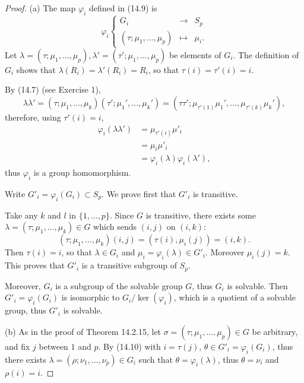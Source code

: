 \documentclass[11pt,a4paper]{article}
\begin{document}
\begin{proof}
\item[(a)] The map $\varphi_i$ defined in  (14.9) is
$$
\varphi_i 
\left\{
\begin{array}{ccc}
G_i & \to &S_p\\
(\tau; \mu_1,\ldots,\mu_p) & \mapsto &\mu_i.
\end{array}
\right.
$$
Let $\lambda = (\tau; \mu_1,\ldots,\mu_p),\lambda' =  (\tau'; \mu_1,\ldots,\mu_p)$ be elements of $G_i$. The definition of $G_i$ shows that $\lambda(R_i) = \lambda'(R_i) = R_i$, so that $\tau(i) =\tau'(i)=i$.  

By (14.7) (see Exercise 1),
$$\lambda \lambda' =(\tau;\mu_1,...,\mu_k)(\tau';\mu_1',...,\mu_k')=(\tau\tau';\mu_{\tau'(1)}\mu_1',...,\mu_{\tau'(k)}\mu_k'),$$ 
therefore, using $\tau'(i) = i$,
\begin{align*}
\varphi_i( \lambda \lambda') &= \mu_{\tau'(i)} \mu'_i\\
&=\mu_i \mu'_i\\
&= \varphi_i(\lambda) \varphi_i(\lambda'),
\end{align*}
thus $\varphi_i$ is a group homomorphism.

\bigskip

Write $G'_i = \varphi_i(G_i) \subset S_p$. We prove first that $G'_i$ is transitive.

Take any $k$ and $l$ in $\{1,\ldots,p\}$. Since $G$ is transitive, there exists some $\lambda = (\tau;\mu_1,...,\mu_k) \in G$ which sends $(i,j)$ on $(i,k)$:
$$(\tau;\mu_1,\ldots,\mu_k)(i,j) = (\tau(i), \mu_i(j)) = (i,k).$$
Then $\tau(i) = i$, so that $\lambda \in G_i$ and $\mu_i = \varphi_i(\lambda) \in G'_i$. Moreover $\mu_i(j) = k$. This proves that $G'_i$ is a transitive subgroup of $S_p$.

Moreover, $G_i$ is a subgroup of the solvable group $G$, thus $G_i$ is solvable. Then $G'_i = \varphi_i(G_i)$ is isomorphic to $G_i/\ker(\varphi_i)$, which is a quotient of a solvable group, thus $G'_i$ is solvable.
\item[(b)] As in the proof of Theorem 14.2.15, let $\sigma = (\tau; \mu_1,\ldots,\mu_p) \in G$ be arbitrary, and fix $j$ between $1$ and $p$. By (14.10) with  $i = \tau(j)$, $\theta \in G'_i = \varphi_i(G_i)$, thus there exists $\lambda = (\rho; \nu_1,\ldots,\nu_p) \in G_i$ such that $\theta = \varphi_i(\lambda)$, thus $\theta = \nu_i$ and $\rho(i) = i$.


\end{proof}
\end{document}
